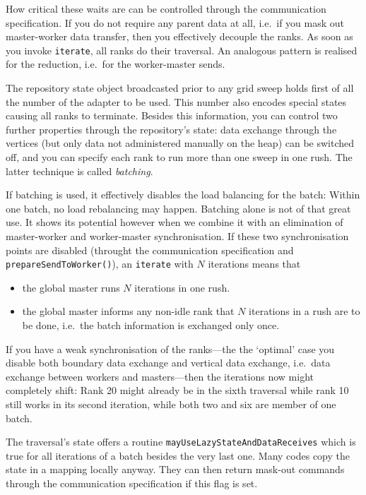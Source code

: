 How critical these waits are can be controlled through the communication
specification. 
If you do not require any parent data at all, i.e.~if you mask out master-worker
data transfer, then you effectively decouple the ranks. 
As soon as you invoke \texttt{iterate}, all ranks do their traversal.
An analogous pattern is realised for the reduction, i.e.~for the worker-master
sends.


The repository state object broadcasted prior to any grid sweep holds first of
all the number of the adapter to be used.
This number also encodes special states causing all ranks to terminate.
Besides this information, you can control two further properties through the
repository's state: data exchange through the vertices (but only data not
administered manually on the heap) can be switched off, and you can specify each
rank to run more than one sweep in one rush.
The latter technique is called {\em batching}.


If batching is used, it effectively disables the load balancing for the batch:
Within one batch, no load rebalancing may happen.
Batching alone is not of that great use. 
It shows its potential however when we combine it with an elimination of
master-worker and worker-master synchronisation.
If these two synchronisation points are disabled (throught the communication
specification and \texttt{prepareSendToWorker()}), an \texttt{iterate} with $N$
iterations means that
\begin{itemize}
  \item the global master runs $N$ iterations in one rush.
  \item the global master informs any non-idle rank that $N$ iterations in a
  rush are to be done, i.e.~the batch information is exchanged only once. 
\end{itemize}
If you have a weak synchronisation of the ranks---the the `optimal' case you
disable both boundary data exchange and vertical data exchange, i.e.~data
exchange between workers and masters---then the iterations now might completely
shift:
Rank 20 might already be in the sixth traversal while rank 10 still works in its
second iteration, while both two and six are member of one batch. 

\begin{remark}
  The traversal's state offers a routine \texttt{mayUseLazyStateAndDataReceives}
  which is true for all iterations of a batch besides the very last one. Many
  codes copy the state in a mapping locally anyway. They can then return
  mask-out commands through the communication specification if this flag is 
  set.
\end{remark}


